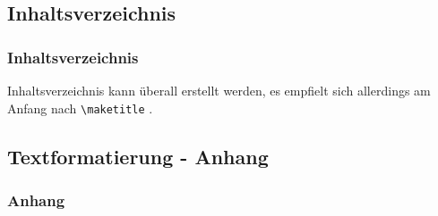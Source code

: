 \documentclass{beamer}
\begin{document}
\subsection{Inhaltsverzeichnis}
\begin{frame}[fragile]
\frametitle{Inhaltsverzeichnis}
Inhaltsverzeichnis kann überall erstellt werden, es empfielt sich allerdings am Anfang nach \verb+\maketitle+ .
  \begin{semiverbatim}
  \end{semiverbatim}
\end{frame}


\subsection{Textformatierung - Anhang}
\begin{frame}[fragile]
\frametitle{Anhang}
  \begin{semiverbatim}
  \end{semiverbatim}
\end{frame}
\end{document}

